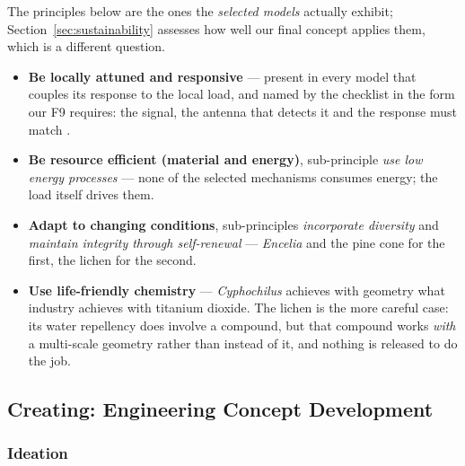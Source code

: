 The principles below are the ones the \emph{selected models} actually exhibit;
Section~\ref{sec:sustainability} assesses how well our final concept applies
them, which is a different question.

\begin{itemize}
  \item \textbf{Be locally attuned and responsive} --- present in every model
        that couples its response to the local load, and named by the checklist
        in the form our F9 requires: the signal, the antenna that detects it and
        the response must match \parencite{baumeister2014}.
  \item \textbf{Be resource efficient (material and energy)}, sub-principle
        \emph{use low energy processes} --- none of the selected mechanisms
        consumes energy; the load itself drives them.
  \item \textbf{Adapt to changing conditions}, sub-principles \emph{incorporate
        diversity} and \emph{maintain integrity through self-renewal} ---
        \emph{Encelia} and the pine cone for the first, the lichen for the
        second.
  \item \textbf{Use life-friendly chemistry} --- \emph{Cyphochilus} achieves
        with geometry what industry achieves with titanium dioxide. The lichen is
        the more careful case: its water repellency does involve a compound, but
        that compound works \emph{with} a multi-scale geometry rather than
        instead of it, and nothing is released to do the job.
\end{itemize}


\subsection{Creating: Engineering Concept Development}
\label{sec:creating}

\subsubsection{Ideation}


